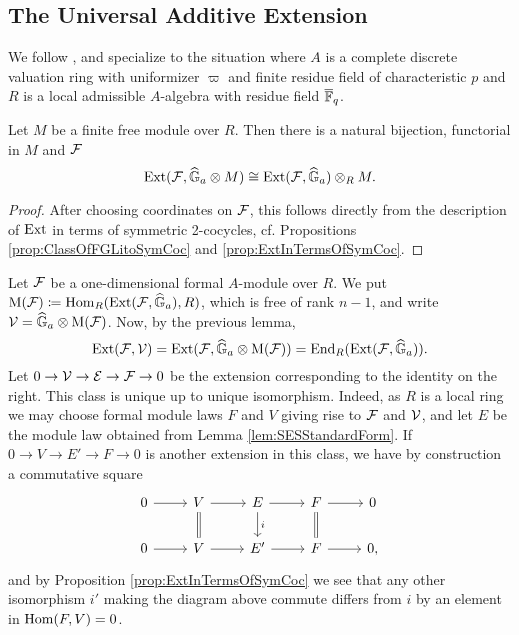 \documentclass[../main.tex]{subfiles}
\begin{document}
\subsection{The Universal Additive Extension} %
\label{sub:The Universal Additive Extension}
We follow \cite[Section 11]{hopkins1994equivariant}, 
and specialize to the situation where $A$ is a complete discrete valuation ring
with uniformizer $\varpi$ and finite residue field of characteristic $p$ and
$R$ is a local admissible $A$-algebra with residue field $\overline {\mathbb{F}}_q$.

\begin{lem}
  Let $M$ be a finite free module over $R$. Then there is a natural bijection,
  functorial in $M$ and $\mathcal{F}$
  \begin{equation*}
    \operatorname{Ext}(\mathcal{F}, \widehat{\mathbb{G}}_a \otimes M) \cong \operatorname{Ext}(\mathcal{F}, \widehat{\mathbb{G}}_a) \otimes_R M.
  \end{equation*}
\begin{proof}
  After choosing coordinates on $\mathcal{F}$, this follows directly from the 
  description of $\operatorname{Ext}$ in terms of symmetric 2-cocycles, cf. Propositions
  \ref{prop:ClassOfFGLitoSymCoc} and \ref{prop:ExtInTermsOfSymCoc}.
\end{proof}
\end{lem}

Let $\mathcal{F}$ be a one-dimensional formal $A$-module over $R$.
We put $\mathrm M(\mathcal{F}) \coloneqq \operatorname{Hom}_R(\operatorname{Ext}(\mathcal{F}, \widehat{\mathbb{G}}_a), R)$, which is free of
rank $n-1$, and
write $\mathcal{V} = \widehat{\mathbb{G}}_a \otimes \mathrm M(\mathcal{F})$. Now, by the previous lemma,
\begin{equation*}
  \operatorname{Ext}(\mathcal{F},\mathcal{V}) = \operatorname{Ext}(\mathcal{F}, \widehat{\mathbb{G}}_a \otimes \mathrm M(\mathcal{F})) = \operatorname{End}_R(\operatorname{Ext}(\mathcal{F}, \widehat{\mathbb{G}}_a)). 
\end{equation*}
Let $0 \to \mathcal{V} \to \mathcal{E} \to \mathcal{F} \to 0$ be the extension corresponding to the identity 
on the right. This class is unique up to unique isomorphism. Indeed, 
as $R$ is a local ring we may choose formal module laws $F$ and $V$ giving rise
to $\mathcal{F}$ and $\mathcal{V}$, and let $E$ be the module law obtained from 
Lemma \ref{lem:SESStandardForm}. 
If $0 \to V \to E' \to F \to 0$ is another extension in this class, we
have by construction a commutative square
\begin{equation*}
\begin{tikzcd}[ampersand replacement=\&]
	0 \& {V} \& E \& F \& 0 \\
	0 \& {V} \& {E'} \& F \& 0,
	\arrow[from=1-1, to=1-2]
	\arrow[from=1-2, to=1-3]
	\arrow[Rightarrow, no head, from=1-2, to=2-2]
	\arrow[from=1-3, to=1-4]
	\arrow["i", from=1-3, to=2-3]
	\arrow[from=1-4, to=1-5]
	\arrow[Rightarrow, no head, from=1-4, to=2-4]
	\arrow[from=2-1, to=2-2]
	\arrow[from=2-2, to=2-3]
	\arrow[from=2-3, to=2-4]
	\arrow[from=2-4, to=2-5]
\end{tikzcd}
\end{equation*}
and by Proposition \ref{prop:ExtInTermsOfSymCoc} we see that 
any other isomorphism $i'$ making the diagram above commute differs from
$i$ by an element in $\operatorname{Hom}(F, V) = 0$. 
\end{document}
